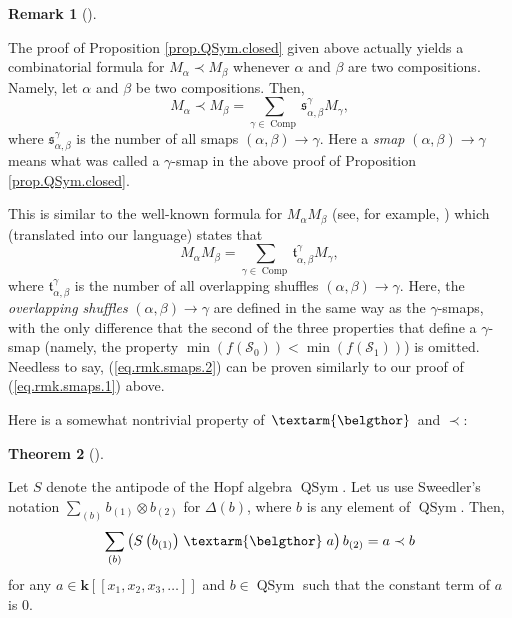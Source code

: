 \documentclass[numbers=enddot,12pt,final,onecolumn,notitlepage,abstracton]{scrartcl}%
\theoremstyle{definition}
\newtheorem{theo}{Theorem}[section]
\newenvironment{theorem}[1][]
{\begin{theo}[#1]\begin{leftbar}}
{\end{leftbar}\end{theo}}
\newtheorem{remk}[theo]{Remark}
\newenvironment{remark}[1][]
{\begin{remk}[#1]\begin{leftbar}}
{\end{leftbar}\end{remk}}
\newcommand{\bel}{\left. \textarm{\belgthor} \right.}
\let\sumnonlimits\sum
\renewcommand{\sum}{\sumnonlimits\limits}
\begin{document}
\begin{remark}
\label{rmk.QSym.closed}The proof of Proposition \ref{prop.QSym.closed} given
above actually yields a combinatorial formula for $M_{\alpha}\left.
\prec\right.  M_{\beta}$ whenever $\alpha$ and $\beta$ are two compositions.
Namely, let $\alpha$ and $\beta$ be two compositions. Then,%
\begin{equation}
M_{\alpha}\left.  \prec\right.  M_{\beta}=\sum_{\gamma\in\operatorname*{Comp}%
}\mathfrak{s}_{\alpha,\beta}^{\gamma}M_{\gamma}, \label{eq.rmk.smaps.1}%
\end{equation}
where $\mathfrak{s}_{\alpha,\beta}^{\gamma}$ is the number of all smaps
$\left(  \alpha,\beta\right)  \rightarrow\gamma$. Here a \textit{smap}
$\left(  \alpha,\beta\right)  \rightarrow\gamma$ means what was called a
$\gamma$-smap in the above proof of Proposition \ref{prop.QSym.closed}.

This is similar to the well-known formula for $M_{\alpha}M_{\beta}$ (see, for
example, \cite[Proposition 5.1.3]{Reiner}) which (translated into our
language) states that
\begin{equation}
M_{\alpha}M_{\beta}=\sum_{\gamma\in\operatorname*{Comp}}\mathfrak{t}%
_{\alpha,\beta}^{\gamma}M_{\gamma}, \label{eq.rmk.smaps.2}%
\end{equation}
where $\mathfrak{t}_{\alpha,\beta}^{\gamma}$ is the number of all overlapping
shuffles $\left(  \alpha,\beta\right)  \rightarrow\gamma$. Here, the
\textit{overlapping shuffles} $\left(  \alpha,\beta\right)  \rightarrow\gamma$
are defined in the same way as the $\gamma$-smaps, with the only difference
that the second of the three properties that define a $\gamma$-smap (namely,
the property $\min\left(  f\left(  \mathcal{S}_{0}\right)  \right)
<\min\left(  f\left(  \mathcal{S}_{1}\right)  \right)  $) is omitted. Needless
to say, (\ref{eq.rmk.smaps.2}) can be proven similarly to our proof of
(\ref{eq.rmk.smaps.1}) above.
\end{remark}

Here is a somewhat nontrivial property of $\bel $ and $\left.  \prec\right.  $:

\begin{theorem}
\label{thm.beldend}Let $S$ denote the antipode of the Hopf algebra
$\operatorname*{QSym}$. Let us use Sweedler's notation $\sum_{\left(
b\right)  }b_{\left(  1\right)  }\otimes b_{\left(  2\right)  }$ for
$\Delta\left(  b\right)  $, where $b$ is any element of $\operatorname*{QSym}%
$. Then,%
\[
\sum_{\left(  b\right)  }\left(  S\left(  b_{\left(  1\right)  }\right)
\bel
a\right)  b_{\left(  2\right)  }=a\left.  \prec\right.  b
\]
for any $a\in\mathbf{k}\left[  \left[  x_{1},x_{2},x_{3},\ldots\right]
\right]  $ and $b\in\operatorname*{QSym}$ such that the constant term of $a$
is $0$.
\end{theorem}
\end{document}

